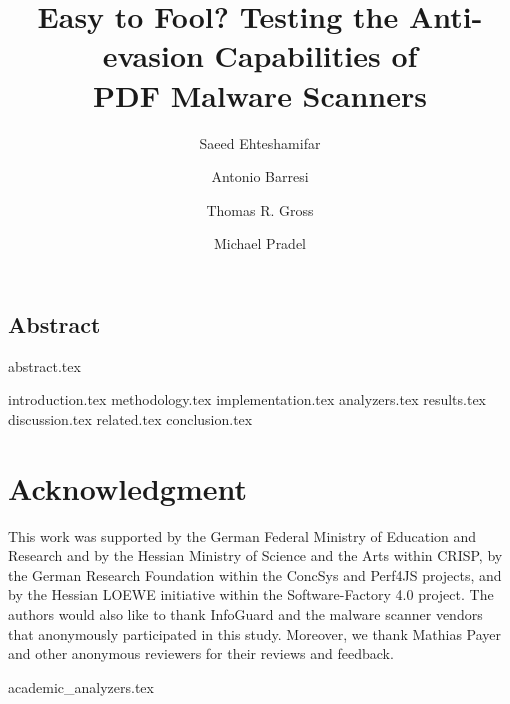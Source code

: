 \documentclass[sigconf,nonacm]{acmart}
\begin{document}
\title{Easy to Fool? Testing the Anti-evasion Capabilities of\\ PDF Malware Scanners}
% 

\author{Saeed Ehteshamifar}

\author{Antonio Barresi}

\author{Thomas R. Gross}

\author{Michael Pradel}


\maketitle

\subsection*{Abstract}
{abstract.tex}



{introduction.tex}
{methodology.tex}
{implementation.tex}
{analyzers.tex}
{results.tex}
{discussion.tex}
{related.tex}
{conclusion.tex}

\section*{Acknowledgment}
This work was supported by the German Federal Ministry of Education and
Research and by the Hessian Ministry of Science and the Arts within
CRISP, by the German Research Foundation within the ConcSys and Perf4JS
projects, and by the Hessian LOEWE initiative within the
Software-Factory 4.0 project.
The authors would also like to thank InfoGuard and the malware scanner vendors that anonymously participated in this study. Moreover, we thank Mathias Payer and other anonymous reviewers for their reviews and feedback.



\newpage
\appendix
{academic_analyzers.tex}
\end{document}
